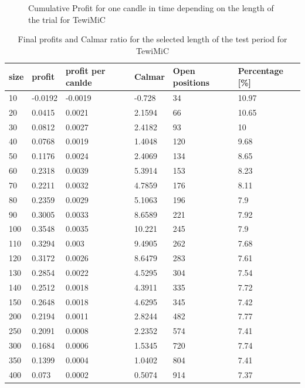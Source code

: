 \documentclass{tewiart}
\begin{document}
\begin{figure}[h!]
\begin{minipage}{.45\linewidth}
\begin{center}
\label{Cum3DPerCMiCend}
\end{center}
\end{minipage}
\caption{Cumulative Profit for one candle in time depending on the length of the trial for TewiMiC}
\end{figure}
\FloatBarrier



\begin{table}[h!] 
\caption{Final profits and Calmar ratio for the selected length of the test period for TewiMiC}
\scriptsize
\label{table1}
\begin{center}
\begin{tabular}{|l|l|l|l|l|l|} 
 \hline size & profit & profit per canlde & Calmar & Open positions & Percentage [\%]\\ \hline  
10 & -0.0192 & -0.0019 & -0.728 & 34 & 10.97 \\ 
 20 & 0.0415 & 0.0021 & 2.1594 & 66 & 10.65 \\ 
 30 & 0.0812 & 0.0027 & 2.4182 & 93 & 10 \\ 
 40 & 0.0768 & 0.0019 & 1.4048 & 120 & 9.68 \\ 
 50 & 0.1176 & 0.0024 & 2.4069 & 134 & 8.65 \\ 
 60 & 0.2318 & 0.0039 & 5.3914 & 153 & 8.23 \\ 
 70 & 0.2211 & 0.0032 & 4.7859 & 176 & 8.11 \\ 
 80 & 0.2359 & 0.0029 & 5.1063 & 196 & 7.9 \\ 
 90 & 0.3005 & 0.0033 & 8.6589 & 221 & 7.92 \\ 
 100 & 0.3548 & 0.0035 & 10.221 & 245 & 7.9 \\ 
 110 & 0.3294 & 0.003 & 9.4905 & 262 & 7.68 \\ 
 120 & 0.3172 & 0.0026 & 8.6479 & 283 & 7.61 \\ 
 130 & 0.2854 & 0.0022 & 4.5295 & 304 & 7.54 \\ 
 140 & 0.2512 & 0.0018 & 4.3911 & 335 & 7.72 \\ 
 150 & 0.2648 & 0.0018 & 4.6295 & 345 & 7.42 \\ 
 200 & 0.2194 & 0.0011 & 2.8244 & 482 & 7.77 \\ 
 250 & 0.2091 & 0.0008 & 2.2352 & 574 & 7.41 \\ 
 300 & 0.1684 & 0.0006 & 1.5345 & 720 & 7.74 \\ 
 350 & 0.1399 & 0.0004 & 1.0402 & 804 & 7.41 \\ 
 400 & 0.073 & 0.0002 & 0.5074 & 914 & 7.37 \\ 
 \hline \end{tabular} 
\end{center}
 \end{table}
 \FloatBarrier
\end{document}
